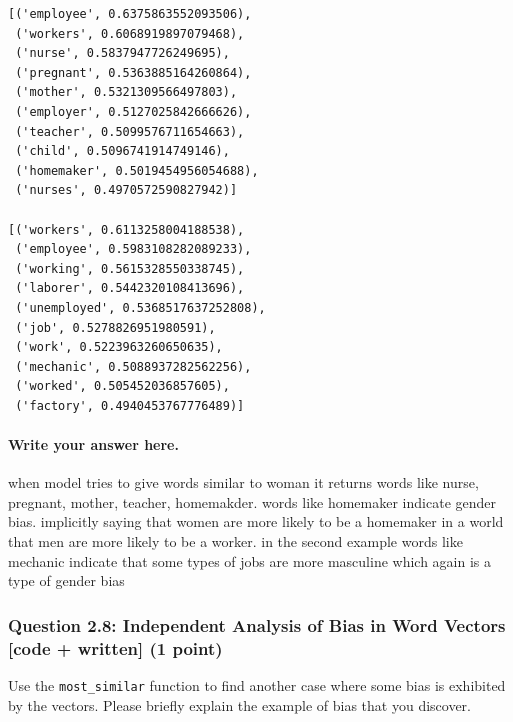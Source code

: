 \documentclass[11pt]{article}
\begin{document}
    \begin{Verbatim}[commandchars=\\\{\}]
[('employee', 0.6375863552093506),
 ('workers', 0.6068919897079468),
 ('nurse', 0.5837947726249695),
 ('pregnant', 0.5363885164260864),
 ('mother', 0.5321309566497803),
 ('employer', 0.5127025842666626),
 ('teacher', 0.5099576711654663),
 ('child', 0.5096741914749146),
 ('homemaker', 0.5019454956054688),
 ('nurses', 0.4970572590827942)]

[('workers', 0.6113258004188538),
 ('employee', 0.5983108282089233),
 ('working', 0.5615328550338745),
 ('laborer', 0.5442320108413696),
 ('unemployed', 0.5368517637252808),
 ('job', 0.5278826951980591),
 ('work', 0.5223963260650635),
 ('mechanic', 0.5088937282562256),
 ('worked', 0.505452036857605),
 ('factory', 0.4940453767776489)]
    \end{Verbatim}

    \hypertarget{write-your-answer-here.}{%
\paragraph{Write your answer here.}\label{write-your-answer-here.}}

when model tries to give words similar to woman it returns words like
nurse, pregnant, mother, teacher, homemakder. words like homemaker
indicate gender bias. implicitly saying that women are more likely to be
a homemaker in a world that men are more likely to be a worker. in the
second example words like mechanic indicate that some types of jobs are
more masculine which again is a type of gender bias

    \hypertarget{question-2.8-independent-analysis-of-bias-in-word-vectors-code-written-1-point}{%
\subsubsection{Question 2.8: Independent Analysis of Bias in Word
Vectors {[}code + written{]} (1
point)}\label{question-2.8-independent-analysis-of-bias-in-word-vectors-code-written-1-point}}

Use the \texttt{most\_similar} function to find another case where some
bias is exhibited by the vectors. Please briefly explain the example of
bias that you discover.
\end{document}
